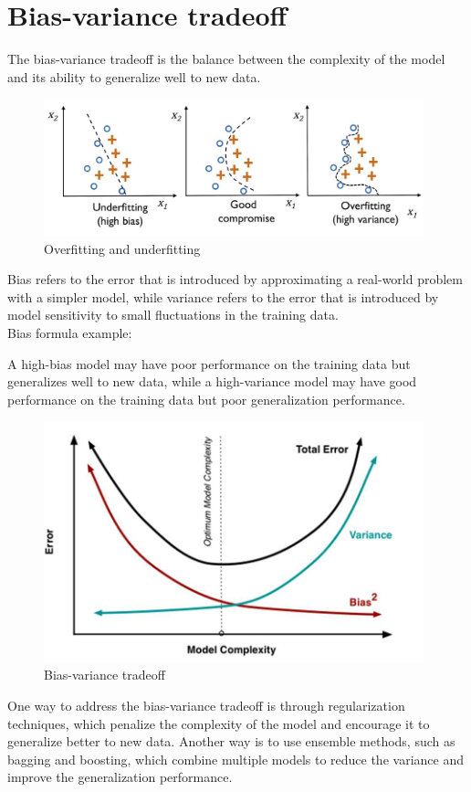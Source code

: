 \documentclass{article}
\begin{document}
\section{Bias-variance tradeoff}
The bias-variance tradeoff is the balance between the complexity of the model and its ability to generalize well to new data.\\
\begin{figure}[!ht]
    \centering
    \includegraphics[width=11cm]{./images/p112_img523.png}
    \caption{Overfitting and underfitting}
\end{figure}

\noindent Bias refers to the error that is introduced by approximating a real-world problem with a simpler model, while variance refers to the error that is introduced by model sensitivity to small fluctuations in the training data.\\
Bias formula example:

A high-bias model may have poor performance on the training data but generalizes well to new data, while a high-variance model may have good performance on the training data but poor generalization performance.\\
\begin{figure}[!ht]
    \centering
    \includegraphics[width=11cm]{./images/p118_img552.png}
    \caption{Bias-variance tradeoff}
\end{figure}

\noindent One way to address the bias-variance tradeoff is through regularization techniques, which penalize the complexity of the model and encourage it to generalize better to new data. Another way is to use ensemble methods, such as bagging and boosting, which combine multiple models to reduce the variance and improve the generalization performance.
\end{document}
